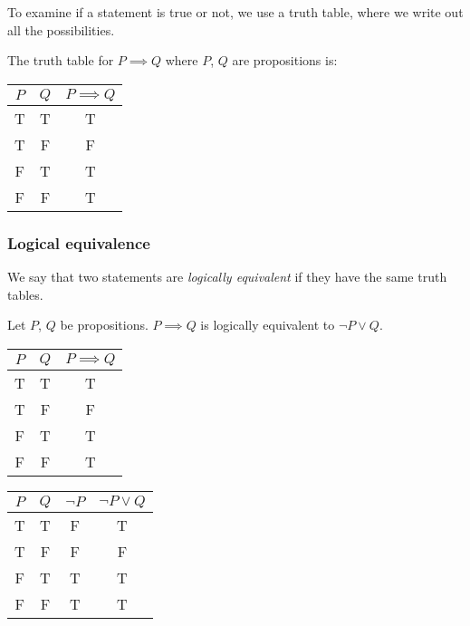 \documentclass{article}
\begin{document}
To examine if a statement is true or not, we use a truth table, where we write out all the possibilities. 

\begin{example}
The truth table for $P \implies Q$ where $P$, $Q$ are propositions is:

\begin{tabular}{|c|c| c|}
\hline
     $P$& $Q$ &  $P \implies Q$ \\ \hline
     T& T & T \\ \hline
     T & F & F \\ \hline
     F & T & T \\ \hline
     F & F & T \\ \hline
\end{tabular}
\end{example}


\subsubsection{Logical equivalence}
We say that two statements are \emph{logically equivalent} if they have the same truth tables.


\begin{example}
\label{ex:implication_table}
Let $P$, $Q$ be propositions. $P \implies Q$ is logically equivalent to $\neg P \vee Q$.
 
 \vspace{1em}
 
\begin{tabular}{|c|c| c|}
\hline
     $P$& $Q$ &  $P \implies Q$ \\ \hline
     T& T & T \\ \hline
     T & F & F \\ \hline
     F & T & T \\ \hline
     F & F & T \\ \hline
\end{tabular} \hspace{2cm} \begin{tabular}{|c | c | c | c|}
\hline
     $P$& $Q$ & $\neg P$ & $\neg P \vee Q$  \\ \hline
     T& T & F & T \\ \hline
     T & F & F & F \\ \hline
     F & T &  T &T \\ \hline
     F & F & T & T \\ \hline
\end{tabular}
\end{example}
\end{document}
